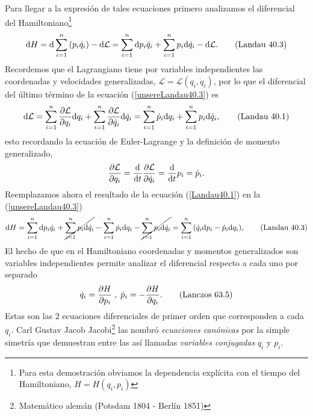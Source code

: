 \documentclass[12pt, spanish, a4paper, ]{article}
\begin{document}
Para llegar a la expresión de tales ecuaciones primero analizamos el diferencial del Hamiltoniano\footnote{Para esta demostración obviamos la dependencia explícita con el tiempo del Hamiltoniano, \(H=H(q_i, p_i)\)}
\begin{equation}\label{unsereLandau40.3}
	\dd H= \dd \sum_{i=1}^n  \pqty{p_i \dot{q}_i} - \dd \mathcal{L}
	= \sum_{i=1}^n \dd p_i \dot{q}_i+ \sum_{i=1}^n p_i \dd \dot{q}_i - \dd \mathcal{L} .
    \tag{Landau 40.3}
\end{equation}
Recordemos que el Lagrangiano tiene por variables independientes las coordenadas y velocidades generalizadas, \(\mathcal{L} = \mathcal{L}(q_i, \dot{q}_i)\), por lo que el diferencial del último término de la ecuación (\ref{unsereLandau40.3}) es
\begin{equation}\label{Landau40.1}
	\dd \mathcal{L}= \sum_{i=1}^n \pdv{\mathcal{L}}{q_i} \dd q_i+ \sum_{i=1}^n \pdv{\mathcal{L}}{\dot{q}_i} \dd \dot{q}_i
	= \sum_{i=1}^n \dot{p}_i \dd q_i+ \sum_{i=1}^n p_i \dd \dot{q}_i ,
    \tag{Landau 40.1}
\end{equation}
esto recordando la ecuación de Euler-Lagrange y la definición de momento generalizado, 
\begin{equation}
	\pdv{\mathcal{L}}{q_i}= \dv{t} \pdv{\mathcal{L}}{\dot{q}_i}= \dv{t} p_i= \dot{p}_i .
    \label{alguno}
\end{equation}
Reemplazamos ahora el resultado de la ecuación (\ref{Landau40.1}) en la (\ref{unsereLandau40.3})
\begin{equation}\label{Landau40.3}
	\dd H = \sum_{i=1}^n \dd p_i \dot{q}_i+ \cancel{\sum_{i=1}^n p_i \dd \dot{q}_i} - \sum_{i=1}^n \dot{p}_i \dd q_i - \cancel{\sum_{i=1}^n p_i \dd \dot{q}_i} 
	= \sum_{i=1}^n \pqty{ \dot{q}_i \dd p_i - \dot{p}_i \dd q_i } ,
    \tag{Landau 40.3}
\end{equation}
El hecho de que en el Hamiltoniano coordenadas y momentos generalizados son variables independientes permite analizar el diferencial respecto a cada uno por separado
\begin{equation}\label{Lanczos63.5}
	\dot{q}_i= \pdv{H}{p_i}\;,\;\dot{p}_i= -\pdv{H}{q_i}.
    \tag{Lanczos 63.5}
\end{equation}
Estas son las \(2\) ecuaciones diferenciales de primer orden que corresponden a cada \(q_i\).
Carl Gustav Jacob Jacobi\footnote{Matemático alemán (Potsdam 1804 - Berlín 1851)} las nombró \emph{ecuaciones canónicas} por la simple simetría que demuestran entre las así llamadas \emph{variables conjugadas} \(q_i\) y \(p_i\).
\end{document}
